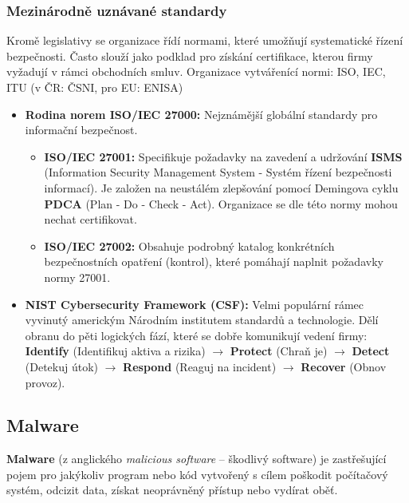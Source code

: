 \subsubsection*{Mezinárodně uznávané standardy}
Kromě legislativy se organizace řídí normami, které umožňují systematické řízení bezpečnosti. Často slouží jako podklad pro získání certifikace, kterou firmy vyžadují v rámci obchodních smluv.
Organizace vytvářenící normi: ISO, IEC, ITU (v ČR: ČSNI, pro EU: ENISA)
\begin{itemize}
    \item \textbf{Rodina norem ISO/IEC 27000:} Nejznámější globální standardy pro informační bezpečnost.
    \begin{itemize}
        \item \textbf{ISO/IEC 27001:} Specifikuje požadavky na zavedení a udržování \textbf{ISMS} (Information Security Management System - Systém řízení bezpečnosti informací). Je založen na neustálém zlepšování pomocí Demingova cyklu \textbf{PDCA} (Plan - Do - Check - Act). Organizace se dle této normy mohou nechat certifikovat.
        \item \textbf{ISO/IEC 27002:} Obsahuje podrobný katalog konkrétních bezpečnostních opatření (kontrol), které pomáhají naplnit požadavky normy 27001.
    \end{itemize}
    \item \textbf{NIST Cybersecurity Framework (CSF):} Velmi populární rámec vyvinutý americkým Národním institutem standardů a technologie. Dělí obranu do pěti logických fází, které se dobře komunikují vedení firmy: \textbf{Identify} (Identifikuj aktiva a rizika) $\rightarrow$ \textbf{Protect} (Chraň je) $\rightarrow$ \textbf{Detect} (Detekuj útok) $\rightarrow$ \textbf{Respond} (Reaguj na incident) $\rightarrow$ \textbf{Recover} (Obnov provoz).
\end{itemize}

\subsection{Malware}

\textbf{Malware} (z anglického \textit{malicious software} – škodlivý software) je zastřešující pojem pro jakýkoliv program nebo kód vytvořený s cílem poškodit počítačový systém, odcizit data, získat neoprávněný přístup nebo vydírat oběť. 

